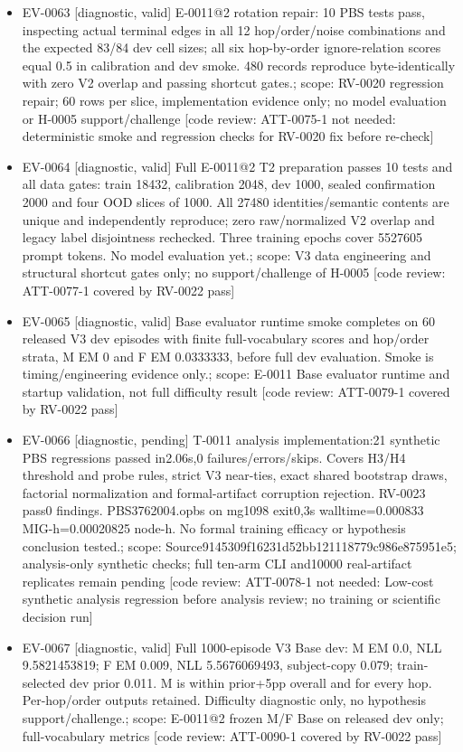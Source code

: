 \documentclass[11pt]{article}
\begin{document}
\begin{itemize}
\item EV-0063 [diagnostic, valid] E-0011@2 rotation repair: 10 PBS tests pass, inspecting actual terminal edges in all 12 hop/order/noise combinations and the expected 83/84 dev cell sizes; all six hop-by-order ignore-relation scores equal 0.5 in calibration and dev smoke. 480 records reproduce byte-identically with zero V2 overlap and passing shortcut gates.; scope: RV-0020 regression repair; 60 rows per slice, implementation evidence only; no model evaluation or H-0005 support/challenge [code review: ATT-0075-1 not needed: deterministic smoke and regression checks for RV-0020 fix before re-check]
\item EV-0064 [diagnostic, valid] Full E-0011@2 T2 preparation passes 10 tests and all data gates: train 18432, calibration 2048, dev 1000, sealed confirmation 2000 and four OOD slices of 1000. All 27480 identities/semantic contents are unique and independently reproduce; zero raw/normalized V2 overlap and legacy label disjointness rechecked. Three training epochs cover 5527605 prompt tokens. No model evaluation yet.; scope: V3 data engineering and structural shortcut gates only; no support/challenge of H-0005 [code review: ATT-0077-1 covered by RV-0022 pass]
\item EV-0065 [diagnostic, valid] Base evaluator runtime smoke completes on 60 released V3 dev episodes with finite full-vocabulary scores and hop/order strata, M EM 0 and F EM 0.0333333, before full dev evaluation. Smoke is timing/engineering evidence only.; scope: E-0011 Base evaluator runtime and startup validation, not full difficulty result [code review: ATT-0079-1 covered by RV-0022 pass]
\item EV-0066 [diagnostic, pending] T-0011 analysis implementation:21 synthetic PBS regressions passed in2.06s,0 failures/errors/skips. Covers H3/H4 threshold and probe rules, strict V3 near-ties, exact shared bootstrap draws, factorial normalization and formal-artifact corruption rejection. RV-0023 pass0 findings. PBS3762004.opbs on mg1098 exit0,3s walltime=0.000833 MIG-h=0.00020825 node-h. No formal training efficacy or hypothesis conclusion tested.; scope: Source9145309f16231d52bb121118779c986e875951e5; analysis-only synthetic checks; full ten-arm CLI and10000 real-artifact replicates remain pending [code review: ATT-0078-1 not needed: Low-cost synthetic analysis regression before analysis review; no training or scientific decision run]
\item EV-0067 [diagnostic, valid] Full 1000-episode V3 Base dev: M EM 0.0, NLL 9.5821453819; F EM 0.009, NLL 5.5676069493, subject-copy 0.079; train-selected dev prior 0.011. M is within prior+5pp overall and for every hop. Per-hop/order outputs retained. Difficulty diagnostic only, no hypothesis support/challenge.; scope: E-0011@2 frozen M/F Base on released dev only; full-vocabulary metrics [code review: ATT-0090-1 covered by RV-0022 pass]

\end{itemize}
\end{document}
